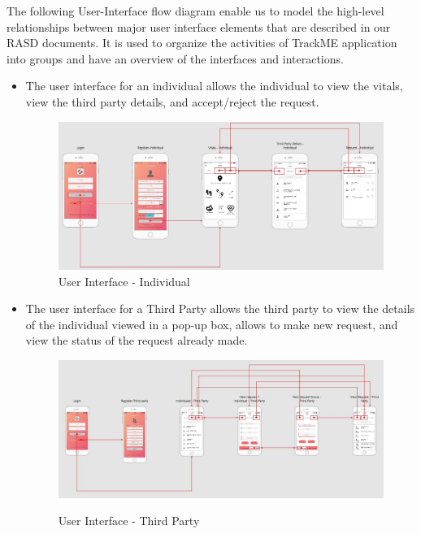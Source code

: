 The following User-Interface flow diagram enable us to model the high-level relationships between major user interface elements that are described in our RASD documents. It is used to organize the activities of TrackME application into groups and have an overview of the interfaces and interactions. \newline

\begin{itemize}
\item The user interface for an individual allows the individual to view the vitals, view the third party details, and accept/reject the request.
\begin{figure}[H]
	\begin{center}
		\includegraphics[width=\textwidth]{./DD_Diagrams/UI_Individual.JPG}
        \caption{User Interface - Individual}
        \label{ui_individual}
	\end{center}
\end{figure}
\end{itemize}

\begin{itemize}
\item The user interface for a Third Party allows the third party to view the details of the individual viewed in a pop-up box, allows to make new request, and view the status of the request already made.
\begin{figure}[H]
	\begin{center}
		\includegraphics[width=\textwidth]{./DD_Diagrams/UI_ThirdParty.JPG}
        \label{ui_thirdparty}
        \caption{User Interface - Third Party}
	\end{center}
\end{figure}
\end{itemize}

